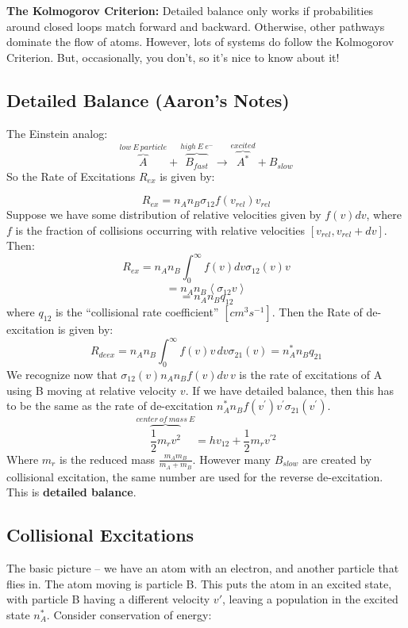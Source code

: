 \documentclass{article}
\def\sigot{\sigma_{12}}
\def\sigto{\sigma_{21}}
\def\mean#1{\left\langle {#1}\right\rangle}
\def\sigot{\sigma_{12}}
\def\sigto{\sigma_{21}}
\begin{document}
\textbf{The Kolmogorov Criterion:} Detailed balance only works if probabilities around closed loops match forward and backward. Otherwise, other pathways dominate the flow of atoms. However, lots of systems do follow the Kolmogorov Criterion. But, occasionally, you don't, so it's nice to know about it!


\subsection{Detailed Balance (Aaron's Notes)}

The Einstein analog:
$$\overbrace{A}^{low\ E\ particle} + \overbrace{B_{fast}}^{high\ E\ e^-}
\to \overbrace{A^*}^{excited} + B_{slow}$$
So the Rate of Excitations $R_{ex}$ is given by:

\def\rex{R_{ex}}
\def\vrel{v_{rel}}
$$\rex = n_An_B\sigma_{12}f(\vrel)\vrel$$
Suppose we have some distribution of relative velocities given by $f(v)dv$,
where $f$ is the fraction of collisions occurring with relative velocities
$[\vrel, \vrel +dv]$.  Then:
$$\rex = n_An_B\int_0^{\infty}f(v)dv\sigot(v)v$$
$$=n_An_B \mean{\sigot v}$$
\def\qot{q_{12}}
\def\qto{q_{21}}
$$=n_An_B\qot$$
where $\qot$ is the ``collisional rate coefficient'' $[cm^3s^{-1}]$.  Then the
Rate of de-excitation is given by:
$$R_{deex} = n_An_B\int_0^\infty{f(v)v\,dv\sigma_{21}(v) = n_A^*n_B\qto}$$
We recognize now that $\sigot(v)n_An_Bf(v)dv\,v$ is the rate of excitations of 
A using B moving at relative velocity $v$.  If we have detailed balance,
then this has to be the same as the rate of de-excitation
$n_A^*n_Bf(v^\prime)v^\prime\sigto(v^\prime)$.
$$\overbrace{\frac12 m_rv^2}^{center\ of\ mass\ E} = hv_{12} + \frac12 m_rv^{\prime2}$$
Where $m_r$ is the reduced mass $\frac{m_A m_B}{m_A+m_B}$. However many $B_{slow}$
are created by collisional excitation, the same number are used for the
reverse de-excitation.  This is {\bf detailed balance}.\par


\subsection{Collisional Excitations}

The basic picture -- we have an atom with an electron, and another particle that flies in. The atom moving is particle B. This puts the atom in an excited state, with particle B having a different velocity $v'$, leaving a population in the excited state $n_A^*$. Consider conservation of energy:
\end{document}
